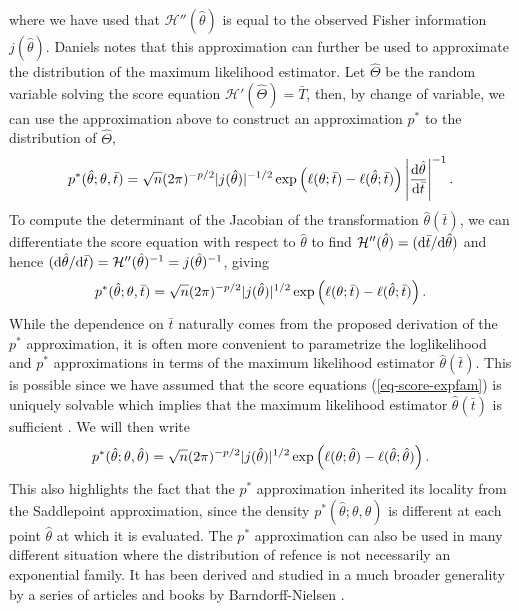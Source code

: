 where we have used that $\mathcal{H}''(\hat\theta)$ is equal to the observed Fisher information $j(\hat\theta)$. Daniels \cite{daniels1958} notes that this approximation can further be used to approximate the distribution of the maximum likelihood estimator. Let $\hat\Theta$ be the random variable solving the score equation $\mathcal{H}'(\hat\Theta) = \bar T$, then, by change of variable, we can use the approximation above to construct an approximation $p^*$ to the distribution of $\hat\Theta$,
\begin{equation*}
    p^*(\hat\theta; \theta, \bar t) = \sqrt{n} (2\pi)^{-p/2}|j(\hat\theta)|^{-1/2} \exp\left(\ell(\theta; \bar t) - \ell(\hat\theta; \bar t)\right) \left|\frac{\text{d} \hat\theta}{\text{d} \bar t}\right|^{-1}.
\end{equation*}
To compute the determinant of the Jacobian of the transformation $\hat\theta(\bar t)$, we can differentiate the score equation with respect to $\hat\theta$ to find $\mathcal{H}''(\hat\theta) = (\text{d} \bar t / \text{d} \hat\theta)$ and hence $(\text{d} \hat\theta / \text{d} \bar t) = \mathcal{H}''(\hat\theta)^{-1} = j(\hat\theta)^{-1}$, giving
\begin{equation} \label{eq-pstar}
    p^*(\hat\theta; \theta, \bar t) = \sqrt{n} (2\pi)^{-p/2}|j(\hat\theta)|^{1/2} \exp\left(\ell(\theta; \bar t) - \ell(\hat\theta; \bar t)\right).
\end{equation}
While the dependence on $\bar t$ naturally comes from the proposed derivation of the $p^*$ approximation, it is often more convenient to parametrize the loglikelihood and $p^*$ approximations in terms of the maximum likelihood estimator $\hat\theta(\bar t)$. This is possible since we have assumed that the score equations (\ref{eq-score-expfam}) is uniquely solvable which implies that the maximum likelihood estimator $\hat\theta(\bar t)$ is sufficient . We will then write
\begin{equation*}
    p^*(\hat\theta; \theta, \hat\theta) = \sqrt{n} (2\pi)^{-p/2}|j(\hat\theta)|^{1/2} \exp\left(\ell(\theta; \hat\theta) - \ell(\hat\theta; \hat\theta)\right).
\end{equation*}
This also highlights the fact that the $p^*$ approximation inherited its locality from the Saddlepoint approximation, since the density $p^*(\hat\theta; \theta, \hat\theta)$ is different at each point $\hat\theta$ at which it is evaluated. The $p^*$ approximation can also be used in many different situation where the distribution of refence is not necessarily an exponential family. It has been derived and studied in a much broader generality by a series of articles and books by Barndorff-Nielsen \cite{BarndorffNielsen1980,BarndorffNielsen1983}.  

